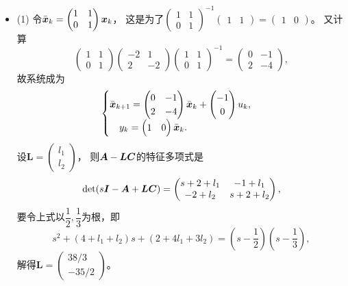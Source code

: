 \begin{itemize}
    \item[30.] (1) 令$\bar{\boldsymbol{x}}_k=\begin{pmatrix}1&1\\0&1\end{pmatrix}\boldsymbol{x}_k$，
    这是为了$\begin{pmatrix}1&1\\0&1\end{pmatrix}^{-1}
    \begin{pmatrix}1&1\end{pmatrix}=\begin{pmatrix}1&0\end{pmatrix}$。
    又计算\[\begin{pmatrix}1&1\\0&1\end{pmatrix}
    \begin{pmatrix}-2&1\\2&-2\end{pmatrix}
    \begin{pmatrix}1&1\\0&1\end{pmatrix}^{-1}
    =\begin{pmatrix}0&-1\\2&-4\end{pmatrix},\]
    故系统成为\[\begin{cases}\bar{\boldsymbol{x}}_{k+1}=
    \begin{pmatrix}0&-1\\2&-4\end{pmatrix}\bar{\boldsymbol{x}}_k
    +\begin{pmatrix}-1\\0\end{pmatrix}u_k,\\
    \quad y_k=\begin{pmatrix}1&0\end{pmatrix}\bar{\boldsymbol{x}}_k.\end{cases}\]
    设$\boldsymbol{L}=\begin{pmatrix}l_1\\l_2\end{pmatrix}$，
    则$\boldsymbol{A}-\boldsymbol{L}\boldsymbol{C}$的特征多项式是
    \[\det(s\boldsymbol{I}-\boldsymbol{A}+\boldsymbol{L}\boldsymbol{C})=\begin{pmatrix}s+2+l_1&-1+l_1\\
    -2+l_2&s+2+l_2\end{pmatrix},\]
    要令上式以$\dfrac12,\dfrac13$为根，即
    \[s^2+(4+l_1+l_2)s+(2+4l_1+3l_2)=(s-\frac12)(s-\frac13),\]
    解得$\boldsymbol{L}=\begin{pmatrix}38/3\\-35/2\end{pmatrix}$。


\end{itemize}
